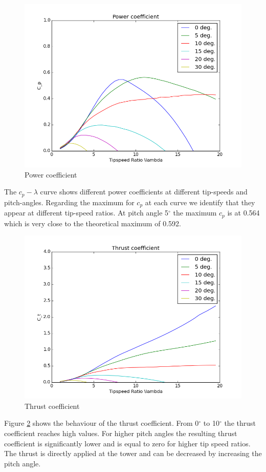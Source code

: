 \documentclass[10pt]{article}
\begin{document}
\begin{figure}[H]
\centering
\includegraphics[width=1\linewidth]{../CIP_3/WT_Perf/Output/cp.png}
\caption{Power coefficient}
\label{fig:c-lambda}
\end{figure} 
The $c_p-\lambda$ curve shows different power coefficients at different tip-speeds and pitch-angles. Regarding the maximum for $c_p$ at each curve we identify that they appear at different tip-speed ratios. At pitch angle 5$^\circ$ the maximum $c_p$ is at 0.564 which is very close to the theoretical maximum of 0.592.

\begin{figure}[H]
\centering
\includegraphics[width=1\linewidth]{../CIP_3/WT_Perf/Output/thrust.png}
\caption{Thrust coefficient}
\label{fig:thrust-coeff}
\end{figure} 
Figure \ref{fig:thrust-coeff} shows the behaviour of the thrust coefficient. 
From 0$^\circ$ to 10$^\circ$ the thrust coefficient reaches high values. For higher pitch angles the resulting thrust coefficient is significantly lower and is equal to zero for higher tip speed ratios. The thrust is directly applied at the tower and can be decreased by increasing the pitch angle.
\end{document}
